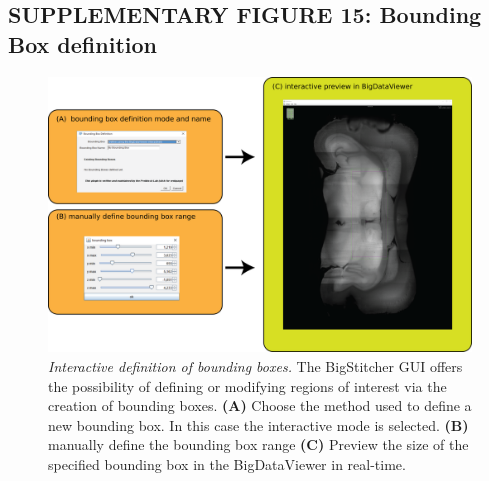 \documentclass[]{spie}  %
\begin{document}
\subsection*{SUPPLEMENTARY FIGURE 15: Bounding Box definition}
\vspace{1mm}
\begin{figure}[h!]
\includegraphics[width=\textwidth]{Supp-BB.png}
\vspace{-2.0mm}
\caption{\hspace{-0.5mm} \emph{Interactive definition of bounding boxes.} The BigStitcher GUI offers the possibility of defining or modifying regions of interest via the creation of bounding boxes. \textbf{(A)} Choose the method used to define a new bounding box. In this case the interactive mode is selected. \textbf{(B)} manually define the bounding box range \textbf{(C)} Preview the size of the specified bounding box in the BigDataViewer in real-time.
}
\label{fig:sup-fig-boundingbox}
\end{figure}

\pagebreak
\end{document}
